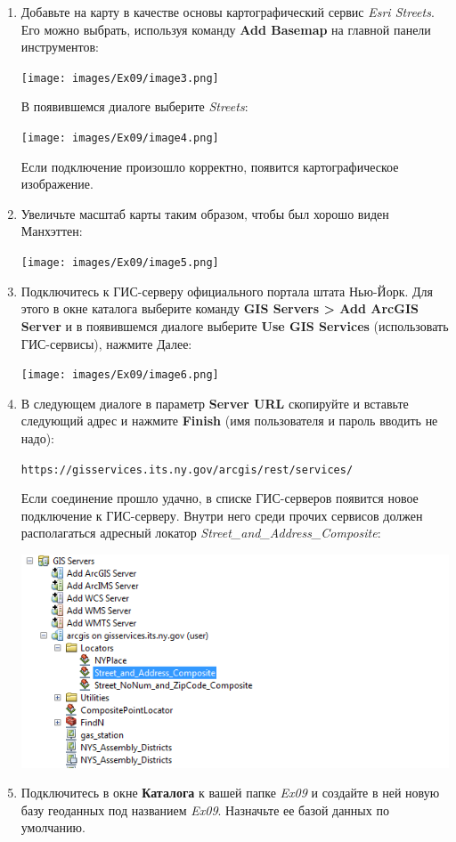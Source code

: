 \documentclass[12pt,]{book}
\begin{document}
\begin{enumerate}
\def\labelenumi{\arabic{enumi}.}
\item
  Добавьте на карту в качестве основы картографический сервис \emph{Esri Streets}. Его можно выбрать, используя команду \textbf{Add Basemap} на главной панели инструментов:

  \texttt{[image: images/Ex09/image3.png]}

  В появившемся диалоге выберите \emph{Streets}:

  \texttt{[image: images/Ex09/image4.png]}

  Если подключение произошло корректно, появится картографическое
  изображение.
\item
  Увеличьте масштаб карты таким образом, чтобы был хорошо виден Манхэттен:

  \texttt{[image: images/Ex09/image5.png]}
\item
  Подключитесь к ГИС-серверу официального портала штата Нью-Йорк. Для этого в окне каталога выберите команду \textbf{GIS Servers \textgreater{} Add ArcGIS Server} и в появившемся диалоге выберите \textbf{Use GIS Services} (использовать ГИС-сервисы), нажмите Далее:

  \texttt{[image: images/Ex09/image6.png]}
\item
  В следующем диалоге в параметр \textbf{Server URL} скопируйте и вставьте следующий адрес и нажмите \textbf{Finish} (имя пользователя и пароль вводить не надо):

  \texttt{https://gisservices.its.ny.gov/arcgis/rest/services/}

  Если соединение прошло удачно, в списке ГИС-серверов появится новое подключение к ГИС-серверу. Внутри него среди прочих сервисов должен располагаться адресный локатор \emph{Street\_and\_Address\_Composite}:

  \includegraphics{images/Ex09/locator.png}
\item
  Подключитесь в окне \textbf{Каталога} к вашей папке \emph{Ex09} и создайте в ней новую базу геоданных под названием \emph{Ex09}. Назначьте ее базой данных по умолчанию.
\end{enumerate}
\end{document}
